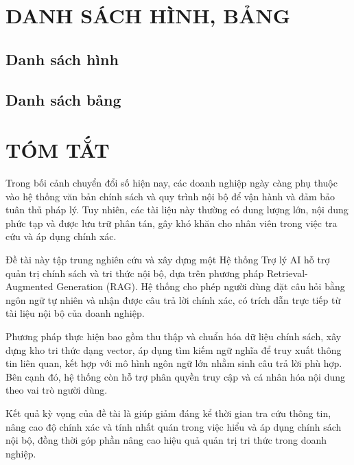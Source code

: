 \documentclass[12pt,a4paper]{report}
\makeatletter
\newcommand{\customlistoffigures}{%
    \section*{\listfigurename}%
    \@starttoc{lof}%
}
\newcommand{\customlistoftables}{%
    \section*{\listtablename}%
    \@starttoc{lot}%
}
\makeatother
\begin{document}
\clearpage
{}
\setcounter{page}{2}

{}
\tableofcontents
\clearpage

{}
\chapter*{DANH SÁCH HÌNH, BẢNG}

\renewcommand{\listfigurename}{Danh sách hình}
\renewcommand{\listtablename}{Danh sách bảng}

\customlistoffigures
\vspace{1.5cm}
\customlistoftables
\clearpage

{}
\chapter*{TÓM TẮT}

Trong bối cảnh chuyển đổi số hiện nay, các doanh nghiệp ngày càng phụ thuộc vào hệ thống văn bản chính sách và quy trình nội bộ để vận hành và đảm bảo tuân thủ pháp lý. Tuy nhiên, các tài liệu này thường có dung lượng lớn, nội dung phức tạp và được lưu trữ phân tán, gây khó khăn cho nhân viên trong việc tra cứu và áp dụng chính xác.

Đề tài này tập trung nghiên cứu và xây dựng một Hệ thống Trợ lý AI hỗ trợ quản trị chính sách và tri thức nội bộ, dựa trên phương pháp Retrieval-Augmented Generation (RAG). Hệ thống cho phép người dùng đặt câu hỏi bằng ngôn ngữ tự nhiên và nhận được câu trả lời chính xác, có trích dẫn trực tiếp từ tài liệu nội bộ của doanh nghiệp.

Phương pháp thực hiện bao gồm thu thập và chuẩn hóa dữ liệu chính sách, xây dựng kho tri thức dạng vector, áp dụng tìm kiếm ngữ nghĩa để truy xuất thông tin liên quan, kết hợp với mô hình ngôn ngữ lớn nhằm sinh câu trả lời phù hợp. Bên cạnh đó, hệ thống còn hỗ trợ phân quyền truy cập và cá nhân hóa nội dung theo vai trò người dùng.

Kết quả kỳ vọng của đề tài là giúp giảm đáng kể thời gian tra cứu thông tin, nâng cao độ chính xác và tính nhất quán trong việc hiểu và áp dụng chính sách nội bộ, đồng thời góp phần nâng cao hiệu quả quản trị tri thức trong doanh nghiệp.
\end{document}
